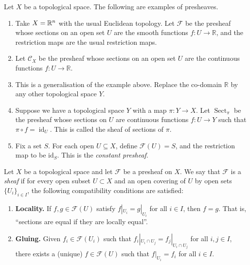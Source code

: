 \begin{example}\label{ex:presheaves}
    Let $X$ be a topological space. The following are examples of presheaves.

    \begin{enumerate}
    \item Take $X = \mathbb{R}^n$ with the usual Euclidean topology.
      Let \(\mathcal{F}\) be the presheaf whose sections on an open set \(U\) are the smooth functions \(f \colon U \to \mathbb{R}\), and the restriction maps are the usual restriction maps.
    \item 
       Let \(\mathcal{C}_X\) be the presheaf whose sections on an open set \(U\) are the continuous functions \(f \colon U \to \mathbb{R}\).
     \item This is a generalisation of the example above.  Replace the co-domain \(\mathbb{R}\) by any other topological space \(Y\).
     \item Suppose we have a topological space \(Y\) with a map \(\pi \colon Y \to X\).
       Let \(\operatorname{Sect}_{\pi}\) be the presheaf whose sections on \(U\) are continuous functions \(f \colon U \to Y\) such that \(\pi \circ f = \operatorname{id}_{U}\).
       This is called the sheaf of sections of \(\pi\).
              
        \item Fix a set $S$. For each open $U \subseteq X$, define $\mathcal{F}(U) = S$, and the restriction map to be $\text{id}_S$. This is the \emph{constant presheaf}.
    \end{enumerate}
    
\end{example}

\begin{definition}[Sheaf]

    Let \(X\) be a topological space and let  $\mathcal{F}$ be a presheaf on \(X\).
  We say that $\mathcal{F}$ is a \emph{sheaf} if for every open subset \(U \subset X\) and an open covering of \(U\) by open sets \(\{U_i\}_{i \in I}\), the following compatibility conditions are satisfied:
    \begin{enumerate}
        \item \textbf{Locality.} If $f, g \in \mathcal{F}(U)$ satisfy $f|_{U_i} = g|_{U_i}$ for all $i \in I$, then $f = g$. That is, ``sections are equal if they are locally equal''.
        \item \textbf{Gluing.} Given $f_i \in \mathcal{F}(U_i)$ such that $f_i|_{U_i \cap U_j} = f_j |_{U_i \cap U_j}$ for all $i, j \in I$, there exists a (unique) $f \in \mathcal{F}(U)$ such that $f|_{U_i} = f_i$ for all $i \in I$. 
    \end{enumerate}
\end{definition}

